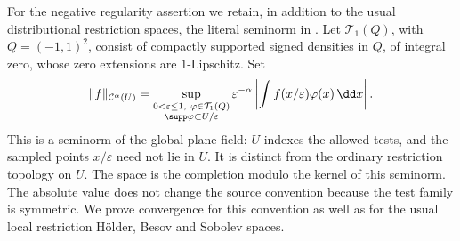 For the negative regularity assertion we retain, in addition to the usual
distributional restriction spaces, the literal seminorm in
\cite[Definition~2.6(iii)]{DKLM2026}. Let \(\mathcal T_1(Q)\), with
\(Q=(-1,1)^2\), consist of compactly supported signed densities in \(Q\),
of integral zero, whose zero extensions are \(1\)-Lipschitz. Set
\begin{equation}\label{eq:source-holder}
 \|f\|_{\mathcal C^\alpha(U)}
 =\sup_{\substack{0<\varepsilon\le1,\ \varphi\in\mathcal T_1(Q)\\
                   \supp\varphi\subset U/\varepsilon}}
   \varepsilon^{-\alpha}
   \left|\int f(x/\varepsilon)\varphi(x)\,\dd x\right|.
\end{equation}
This is a seminorm of the global plane field: \(U\) indexes the allowed
tests, and the sampled points \(x/\varepsilon\) need not lie in \(U\).
It is distinct from the ordinary restriction topology on \(U\).
The space is the completion modulo the kernel of this seminorm.
The absolute value does not change the source convention because the test
family is symmetric. We prove convergence for this convention as well as
for the usual local restriction Hölder, Besov and Sobolev spaces.

